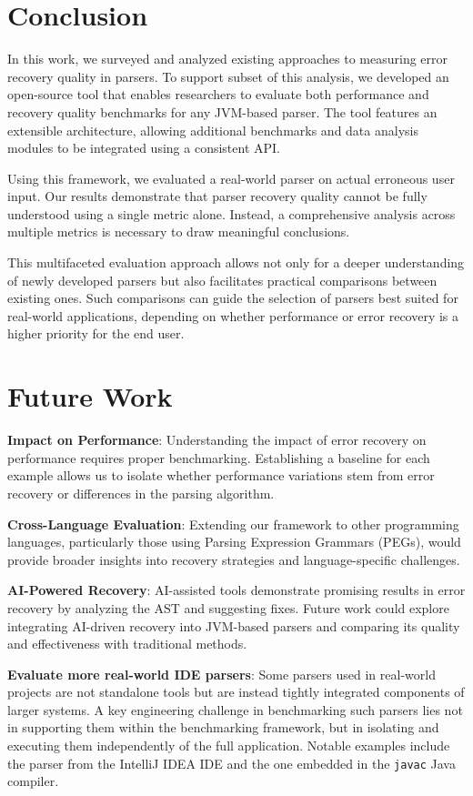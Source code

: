 \documentclass[conference]{IEEEtran}
\begin{document}
\section*{Conclusion}

In this work, we surveyed and analyzed existing approaches to measuring error recovery quality in parsers. To support subset of this analysis, we developed an open-source tool that enables researchers to evaluate both performance and recovery quality benchmarks for any JVM-based parser. The tool features an extensible architecture, allowing additional benchmarks and data analysis modules to be integrated using a consistent API.

Using this framework, we evaluated a real-world parser on actual erroneous user input. Our results demonstrate that parser recovery quality cannot be fully understood using a single metric alone. Instead, a comprehensive analysis across multiple metrics is necessary to draw meaningful conclusions.

This multifaceted evaluation approach allows not only for a deeper understanding of newly developed parsers but also facilitates practical comparisons between existing ones. Such comparisons can guide the selection of parsers best suited for real-world applications, depending on whether performance or error recovery is a higher priority for the end user.

\section{Future Work}

\textbf{Impact on Performance}: Understanding the impact of error recovery on performance requires proper benchmarking. Establishing a baseline for each example allows us to isolate whether performance variations stem from error recovery or differences in the parsing algorithm.

\textbf{Cross-Language Evaluation}: Extending our framework to other programming languages, particularly those using Parsing Expression Grammars (PEGs)\cite{peg-recovery, towards-recovery}, would provide broader insights into recovery strategies and language-specific challenges.

\textbf{AI-Powered Recovery}: AI-assisted tools demonstrate promising results in error recovery by analyzing the AST and suggesting fixes\cite{ai_recovery, seq2parse, ai-c-recovery}. Future work could explore integrating AI-driven recovery into JVM-based parsers and comparing its quality and effectiveness with traditional methods.

\textbf{Evaluate more real-world IDE parsers}: Some parsers used in real-world projects are not standalone tools but are instead tightly integrated components of larger systems. A key engineering challenge in benchmarking such parsers lies not in supporting them within the benchmarking framework, but in isolating and executing them independently of the full application. Notable examples include the parser from the IntelliJ IDEA IDE and the one embedded in the \texttt{javac} Java compiler.





\end{document}
